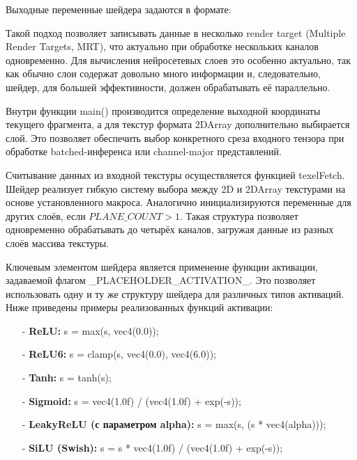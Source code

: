 \documentclass[a4paper,14pt]{extreport}
\begin{document}
            Выходные переменные шейдера задаются в формате:
            
            Такой подход позволяет записывать данные в несколько render target (Multiple Render Targets, MRT), что актуально при обработке нескольких каналов одновременно. Для вычисления нейросетевых слоев это особенно актуально, так как обычно слои содержат довольно много информации и, следовательно, шейдер, для большей эффективности, должен обрабатывать её параллельно.
            
            Внутри функции main() производится определение выходной координаты текущего фрагмента, а для текстур формата 2DArray дополнительно выбирается слой. Это позволяет обеспечить выбор конкретного среза входного тензора при обработке batched-инференса или channel-major представлений.
            
            
            Считывание данных из входной текстуры осуществляется функцией texelFetch. Шейдер реализует гибкую систему выбора между 2D и 2DArray текстурами на основе установленного макроса. Аналогично инициализируются переменные для других слоёв, если $PLANE\_COUNT > 1$. Такая структура позволяет одновременно обрабатывать до четырёх каналов, загружая данные из разных слоёв массива текстуры.
            
            
            Ключевым элементом шейдера является применение функции активации, задаваемой флагом \_PLACEHOLDER\_ACTIVATION\_. Это позволяет использовать одну и ту же структуру шейдера для различных типов активаций. Ниже приведены примеры реализованных функций активации:
            \begin{itemize}
                \item[-] \textbf{ReLU:} s = max(s, vec4(0.0));
                \item[-] \textbf{ReLU6:} s = clamp(s, vec4(0.0), vec4(6.0));
                \item[-] \textbf{Tanh:} s = tanh(s);
                \item[-] \textbf{Sigmoid:} s = vec4(1.0f) / (vec4(1.0f) + exp(-s));
                \item[-] \textbf{LeakyReLU (с параметром alpha):} s = max(s, (s * vec4(alpha)));
                \item[-] \textbf{SiLU (Swish):} s = s * vec4(1.0f) / (vec4(1.0f) + exp(-s));
            \end{itemize}
            
\end{document}

